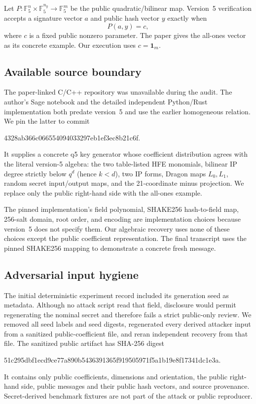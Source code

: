 \documentclass[10pt,a4paper]{article}
\newcommand{\F}{\mathbb{F}}
\begin{document}
Let $P:\F_5^n\times\F_5^{n_y}\to\F_5^m$ be the public quadratic/bilinear
map.  Version~5 verification accepts a signature vector $a$ and public hash
vector $y$ exactly when
\[
                  P(a,y)=c,
\]
where $c$ is a fixed public nonzero parameter.  The paper gives the all-ones
vector as its concrete example.  Our execution uses $c=\boldsymbol{1}_m$.

\subsection{Available source boundary}

The paper-linked C/C++ repository was unavailable during the audit.  The
author's Sage notebook and the detailed independent Python/Rust implementation
both predate version~5 and use the earlier homogeneous relation.  We pin the
latter to commit
\begin{center}
\small\ttfamily 4328ab366c066554094033297eb1ef3ec8b21c6f.
\end{center}
It supplies a concrete q5 key generator whose coefficient distribution agrees
with the literal version-5 algebra: the two table-listed HFE monomials,
bilinear IP degree strictly below $q^d$ (hence $k<d$), two IP forms, Dragon
maps $L_0,L_1$, random secret input/output maps, and the 21-coordinate minus
projection.  We replace only the public right-hand side with the all-ones
example.

The pinned implementation's field polynomial, SHAKE256 hash-to-field map,
256-salt domain, root order, and encoding are implementation choices because
version~5 does not specify them.  Our algebraic recovery uses none of these
choices except the public coefficient representation.  The final transcript
uses the pinned SHAKE256 mapping to demonstrate a concrete fresh message.

\subsection{Adversarial input hygiene}

The initial deterministic experiment record included its generation seed as
metadata.  Although no attack script read that field, disclosure would permit
regenerating the nominal secret and therefore fails a strict public-only
review.  We removed all seed labels and seed digests, regenerated every
derived attacker input from a sanitized public-coefficient file, and reran
independent recovery from that file.  The sanitized public artifact has
SHA-256 digest
\begin{center}
\small\ttfamily
51c295dbf1ecd9ce77a890b5436391365f919505971f5a1b19e8f17341dc1e3a.
\end{center}
It contains only public coefficients, dimensions and orientation, the public
right-hand side, public messages and their public hash vectors, and source
provenance.  Secret-derived benchmark fixtures are not part of the attack or
public reproducer.
\end{document}

